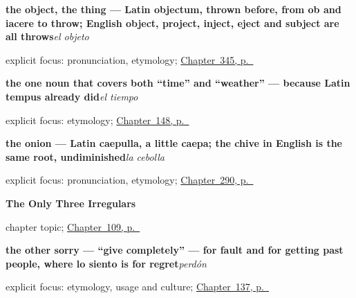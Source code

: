 \noindent\begin{minipage}[t]{\linewidth}
\raggedright
\textbf{the object, the thing — Latin objectum, thrown before, from ob and iacere to throw; English object, project, inject, eject and subject are all throws}\enspace\emph{el objeto}\par
\footnotesize explicit focus: pronunciation, etymology; \hyperref[ch:cada-y-mismo]{Chapter~345, p.~\pageref*{ch:cada-y-mismo}}
\end{minipage}\par\smallskip

\noindent\begin{minipage}[t]{\linewidth}
\raggedright
\textbf{the one noun that covers both \textquotedblleft{}time\textquotedblright{} and \textquotedblleft{}weather\textquotedblright{} — because Latin tempus already did}\enspace\emph{el tiempo}\par
\footnotesize explicit focus: etymology; \hyperref[ch:spanish-weather]{Chapter~148, p.~\pageref*{ch:spanish-weather}}
\end{minipage}\par\smallskip

\noindent\begin{minipage}[t]{\linewidth}
\raggedright
\textbf{the onion — Latin caepulla, a little caepa; the chive in English is the same root, undiminished}\enspace\emph{la cebolla}\par
\footnotesize explicit focus: pronunciation, etymology; \hyperref[ch:lo-que-se-come]{Chapter~290, p.~\pageref*{ch:lo-que-se-come}}
\end{minipage}\par\smallskip

\noindent\begin{minipage}[t]{\linewidth}
\raggedright
\textbf{The Only Three Irregulars}\par
\footnotesize chapter topic; \hyperref[ch:spanish-imperfecto-irregulares]{Chapter~109, p.~\pageref*{ch:spanish-imperfecto-irregulares}}
\end{minipage}\par\smallskip

\noindent\begin{minipage}[t]{\linewidth}
\raggedright
\textbf{the other sorry — \textquotedblleft{}give completely\textquotedblright{} — for fault and for getting past people, where lo siento is for regret}\enspace\emph{perdón}\par
\footnotesize explicit focus: etymology, usage and culture; \hyperref[ch:spanish-sorry]{Chapter~137, p.~\pageref*{ch:spanish-sorry}}
\end{minipage}\par\smallskip

